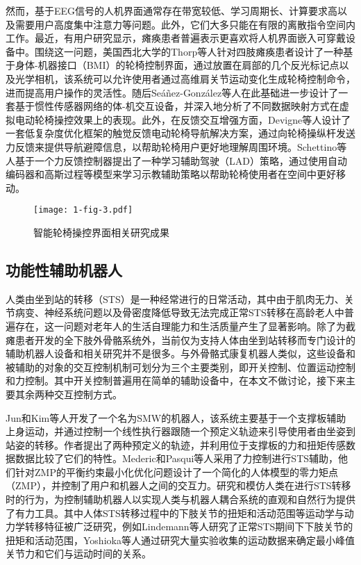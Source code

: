 然而，基于EEG信号的人机界面通常存在带宽较低、学习周期长、计算要求高以及需要用户高度集中注意力等问题。此外，它们大多只能在有限的离散指令空间内工作。最近，有用户研究显示，瘫痪患者普遍表示更喜欢将人机界面嵌入可穿戴设备中\cite{zhangUnderstandingInteractionsSmart2022}。围绕这一问题，美国西北大学的Thorp等人\cite{thorpUpperBodyBasedPower2016d}针对四肢瘫痪患者设计了一种基于身体-机器接口（BMI）的轮椅控制界面，通过放置在肩部的几个反光标记点以及光学相机，该系统可以允许使用者通过高维肩关节运动变化生成轮椅控制命令，进而提高用户操作的灵活性。随后Seáñez-González等人\cite{seanez-gonzalezStaticDynamicDecoding2017}在此基础进一步设计了一套基于惯性传感器网络的体-机交互设备，并深入地分析了不同数据映射方式在虚拟电动轮椅操控效果上的表现。此外，在反馈交互增强方面，Devigne等人\cite{devigneDesignHapticGuidance2018}设计了一套低复杂度优化框架的触觉反馈电动轮椅导航解决方案，通过向轮椅操纵杆发送力反馈来提供导航避障信息，以帮助轮椅用户更好地理解周围环境。Schettino等人\cite{schettinoImprovingGeneralisationLearning2020}基于一个力反馈控制器提出了一种学习辅助驾驶（LAD）策略，通过使用自动编码器和高斯过程等模型来学习示教辅助策略以帮助轮椅使用者在空间中更好移动。

\begin{figure}[h]
  \centering
  \texttt{[image: 1-fig-3.pdf]}
  \caption{智能轮椅操控界面相关研究成果}
  \label{fig:1-3}
\end{figure}

\subsection{功能性辅助机器人}
人类由坐到站的转移（STS）是一种经常进行的日常活动，其中由于肌肉无力、关节病变、神经系统问题以及骨密度降低导致无法完成正常STS转移在高龄老人中普遍存在，这一问题对老年人的生活自理能力和生活质量产生了显著影响。除了为截瘫患者开发的全下肢外骨骼系统外，当前仅为支持人体由坐到站转移而专门设计的辅助机器人设备和相关研究并不是很多。与外骨骼式康复机器人类似，这些设备和被辅助的对象的交互控制机制可划分为三个主要类别，即开关控制、位置运动控制和力控制。其中开关控制普遍用在简单的辅助设备中，在本文不做讨论，接下来主要其余两种交互控制方式。

Jun和Kim等人\cite{hong-guljunWalkingSittostandSupport2011,inhokimKinematicAnalysisSittostand2011}开发了一个名为SMW的机器人，该系统主要基于一个支撑板辅助上身运动，并通过控制一个线性执行器跟随一个预定义轨迹来引导使用者由坐姿到站姿的转移。作者提出了两种预定义的轨迹，并利用位于支撑板的力和扭矩传感数据数据比较了它们的特性。Mederic和Pasqui等人\cite{medericElderlyPeopleSit2006}采用了力控制进行STS辅助，他们针对ZMP的平衡约束最小化优化问题设计了一个简化的人体模型的零力矩点（ZMP），并控制了用户和机器人之间的交互力。研究和模仿人类在进行STS转移时的行为，为控制辅助机器人以实现人类与机器人耦合系统的直观和自然行为提供了有力工具。其中人体STS转移过程中的下肢关节的扭矩和活动范围等运动学与动力学转移特征被广泛研究，例如Lindemann等人\cite{galliQuantitativeAnalysisSit2008}研究了正常STS期间下下肢关节的扭矩和活动范围，Yoshioka等人\cite{yoshiokaBiomechanicalAnalysisRelation2009}通过研究大量实验收集的运动数据来确定最小峰值关节力和它们与运动时间的关系。

